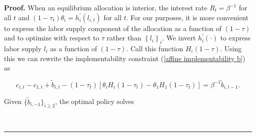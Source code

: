 \documentclass[thmsb,11pt]{article}
\newenvironment{proof}[1][Proof]{\noindent \textbf{#1.} }{\  \rule{0.5em}{0.5em}}
\begin{document}
\begin{proof}
When an equilibrium allocation is interior, the interest rate $R_{t}=\beta
^{-1}$ for all $t$ and %
$\left( 1-\tau _{t}\right) \theta _{i}=h_{i}^{\prime }(l_{i,t})$ for all $%
t.$ For our purposes, it is more convenient to express the labor supply
component of the allocation as a function of $\left( 1-\tau \right) $ and to
optimize with respect to $\tau $ rather than $\left\{ l_{i}\right\} _{i}.$
We  invert  $h_{i}^{\prime }(\cdot )$ to express labor supply $%
l_{i}$ as a function of $\left( 1-\tau \right) .$ Call this function $%
H_{i}\left( 1-\tau \right) $.  Using this we can rewrite the implementability constraint (\ref{affine implementability b}) as

\begin{equation}
c_{i,t}-c_{1,t}+\tilde{b}_{i,t}-\left( 1-\tau _{t}\right)\left[ \theta_iH_{i}\left( 1-\tau _{t}\right)-\theta_1H_{1}\left( 1-\tau _{t}\right)\right]
=\beta ^{-1}\tilde{b}_{i,t-1}.  \label{affine imp quasi}
\end{equation}%

Given $\{\tilde{b}_{i,-1}\}_{i\geq2}$, the optimal policy solves


\end{proof}
\end{document}

